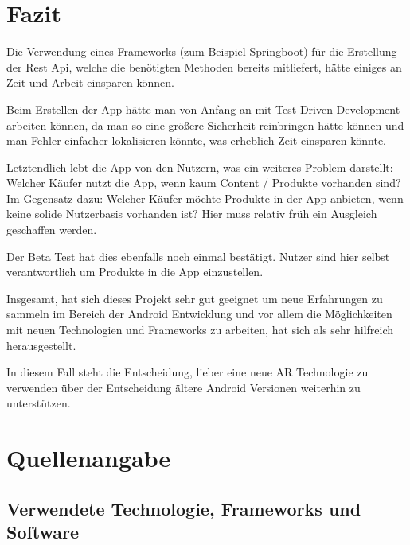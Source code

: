 \documentclass{scrartcl}
\begin{document}

\section{Fazit}

\noindent Die Verwendung eines Frameworks (zum Beispiel Springboot) für die Erstellung der Rest Api, welche die benötigten Methoden bereits mitliefert, hätte einiges an Zeit und Arbeit einsparen können. \newline 

\noindent Beim Erstellen der App hätte man von Anfang an mit Test-Driven-Development arbeiten können, da man so eine größere Sicherheit reinbringen hätte können und man Fehler einfacher lokalisieren könnte, was erheblich Zeit einsparen könnte. \newline 

\noindent Letztendlich lebt die App von den Nutzern, was ein weiteres Problem darstellt: \newline Welcher Käufer nutzt die App, wenn kaum Content / Produkte vorhanden sind? Im Gegensatz dazu: Welcher Käufer möchte Produkte in der App anbieten, wenn keine solide Nutzerbasis vorhanden ist? Hier muss relativ früh ein Ausgleich geschaffen werden. 

\noindent Der Beta Test hat dies ebenfalls noch einmal bestätigt. Nutzer sind hier selbst verantwortlich um Produkte in die App einzustellen. \newline 

\noindent Insgesamt, hat sich dieses Projekt sehr gut geeignet um neue Erfahrungen zu sammeln im Bereich der Android Entwicklung und vor allem die Möglichkeiten mit neuen Technologien und Frameworks zu arbeiten, hat sich als sehr hilfreich herausgestellt. \newline

\noindent In diesem Fall steht die Entscheidung, lieber eine neue AR Technologie zu verwenden über der Entscheidung ältere Android Versionen weiterhin zu unterstützen. \newline

\newpage

\section{Quellenangabe}

\subsection{Verwendete Technologie, Frameworks und Software}
\end{document}
